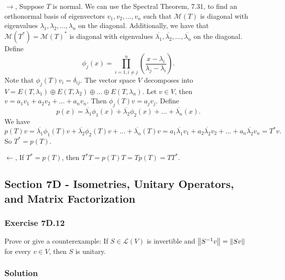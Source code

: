 $\rightarrow$, Suppose $T$ is normal.
We can use the Spectral Theorem, 7.31, to find an orthonormal basis of eigenvectors $v_1, v_2, ..., v_n$ such that $\mathcal{M}(T)$ is diagonal with eigenvalues $\lambda_1, \lambda_2, ..., \lambda_n$ on the diagonal.
Additionally, we have that $\mathcal{M}(T^*) = \mathcal{M}(T)^*$ is diagonal with eigenvalues $\overline{\lambda_1}, \overline{\lambda_2}, ..., \overline{\lambda_n}$ on the diagonal.
Define
\begin{equation*}
    \phi_j(x) = \prod_{i = 1, i \neq j}^{n} \left( \frac{x - \lambda_i}{\lambda_j - \lambda_i} \right).
\end{equation*}
Note that $\phi_j(T)v_i = \delta_{ij}$.
The vector space $V$ decomposes into $V = E(T, \lambda_1) \oplus E(T, \lambda_2) \oplus ... \oplus E(T, \lambda_n)$.
Let $v \in V$, then $v = a_1 v_1 + a_2 v_2 + ... + a_n v_n$.
Then $\phi_j(T)v = a_j v_j$.
Define
\begin{equation*}
    p(x) = \overline{\lambda_1} \phi_1(x) + \overline{\lambda_2} \phi_2(x) + ... + \overline{\lambda_n}(x).
\end{equation*}
We have
\begin{equation*}
    p(T)v = \overline{\lambda_1} \phi_1(T)v + \overline{\lambda_2} \phi_2(T)v + ... + \overline{\lambda_n}(T)v
        = a_1 \overline{\lambda_1} v_1 + a_2 \overline{\lambda_2} v_2 + ... + a_n \overline{\lambda_2} v_n
        = T^* v.
\end{equation*}
So $T^* = p(T)$.

$\leftarrow$, If $T^* = p(T)$, then $T^* T = p(T)T = Tp(T) = TT^*$.


\subsection*{Section 7D - Isometries, Unitary Operators, and Matrix Factorization}

\subsubsection*{Exercise 7D.12}

Prove or give a counterexample: If $S \in \mathcal{L}(V)$ is invertible and $\left\lVert S^{-1}v\right\rVert = \left\lVert Sv\right\rVert$ for every $v \in V$, then $S$ is unitary.

\subsubsection*{Solution}

